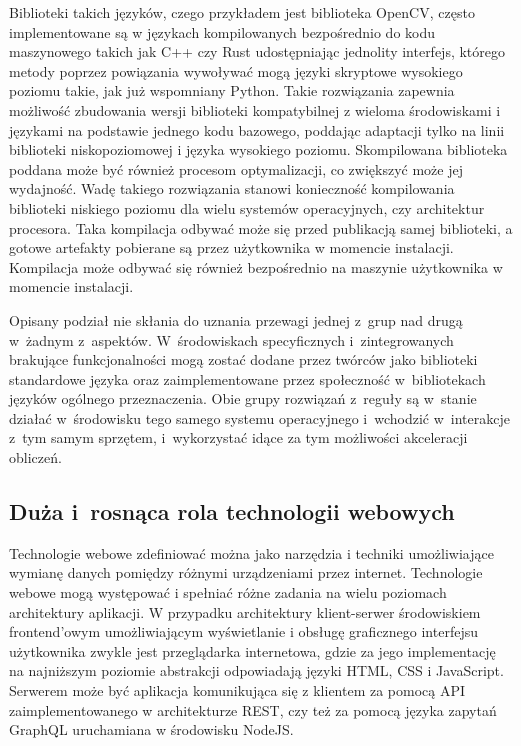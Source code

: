 Biblioteki takich języków, czego przykładem jest biblioteka OpenCV, często implementowane są w językach kompilowanych bezpośrednio do kodu maszynowego takich jak C++ czy Rust udostępniając jednolity interfejs, którego metody poprzez powiązania wywoływać mogą języki skryptowe wysokiego poziomu takie, jak już wspomniany Python. Takie rozwiązania zapewnia możliwość zbudowania wersji biblioteki kompatybilnej z wieloma środowiskami i językami na podstawie jednego kodu bazowego, poddając adaptacji tylko na linii biblioteki niskopoziomowej i języka wysokiego poziomu. Skompilowana biblioteka poddana może być również procesom optymalizacji, co zwiększyć może jej wydajność. Wadę takiego rozwiązania stanowi konieczność kompilowania biblioteki niskiego poziomu dla wielu systemów operacyjnych, czy architektur procesora. Taka kompilacja odbywać może się przed publikacją samej biblioteki, a gotowe artefakty pobierane są przez użytkownika w momencie instalacji. Kompilacja może odbywać się również bezpośrednio na maszynie użytkownika w momencie instalacji.

Opisany podział nie skłania do uznania przewagi jednej z~grup nad drugą w~żadnym z~aspektów. W~środowiskach specyficznych i~zintegrowanych brakujące funkcjonalności mogą zostać dodane przez twórców jako biblioteki standardowe języka oraz zaimplementowane przez społeczność w~bibliotekach języków ogólnego przeznaczenia. Obie grupy rozwiązań z~reguły są w~stanie działać w~środowisku tego samego systemu operacyjnego i~wchodzić w~interakcje z~tym samym sprzętem, i~wykorzystać idące za tym możliwości akceleracji obliczeń.

\subsection{Duża i~rosnąca rola technologii webowych}

Technologie webowe zdefiniować można jako narzędzia i techniki umożliwiające wymianę danych pomiędzy różnymi urządzeniami przez internet. Technologie webowe mogą występować i spełniać różne zadania na wielu poziomach architektury aplikacji. W przypadku architektury klient-serwer środowiskiem frontend'owym umożliwiającym wyświetlanie i obsługę graficznego interfejsu użytkownika zwykle jest przeglądarka internetowa, gdzie za jego implementację na najniższym poziomie abstrakcji odpowiadają języki HTML, CSS i JavaScript. Serwerem może być aplikacja komunikująca się z klientem za pomocą API zaimplementowanego w architekturze REST, czy też za pomocą języka zapytań GraphQL uruchamiana w środowisku NodeJS. 

